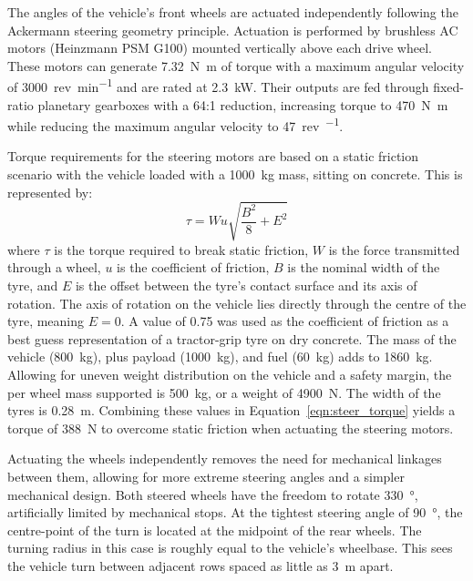 \documentclass[preprint,authoryear,12pt]{elsarticle}
\begin{document}
        The angles of the vehicle's front wheels are actuated independently following the Ackermann steering geometry principle.
        Actuation is performed by brushless AC motors (Heinzmann PSM G100) mounted vertically above each drive wheel.
        These motors can generate \SI{7.32}{\newton\meter} of torque with a maximum angular velocity of \SI{3000}{rev\per\minute} and are rated at \SI{2.3}{\kilo\watt}.
        Their outputs are fed through fixed-ratio planetary gearboxes with a 64:1 reduction, increasing torque to \SI{470}{\newton\meter} while reducing the maximum angular velocity to \SI{47}{rev\per\min}.

        Torque requirements for the steering motors are based on a static friction scenario with the vehicle loaded with a \SI{1000}{\kilo\gram} mass, sitting on concrete.
        This is represented by:
        \begin{equation}
        \label{eqn:steer_torque}
        \tau = W u \sqrt{\frac{B^2}{8} + E^2}
        \end{equation}
        where $\tau$ is the torque required to break static friction, $W$ is the force transmitted through a wheel, $u$ is the coefficient of friction, $B$ is the nominal width of the tyre, and $E$ is the offset between the tyre's contact surface and its axis of rotation.
        The axis of rotation on the vehicle lies directly through the centre of the tyre, meaning $E=0$.
        A value of 0.75 was used as the coefficient of friction as a best guess representation of a tractor-grip tyre on dry concrete.
        The mass of the vehicle (\SI{800}{\kilo\gram}), plus payload (\SI{1000}{\kilo\gram}), and fuel (\SI{60}{\kilo\gram}) adds to \SI{1860}{\kilo\gram}.
        Allowing for uneven weight distribution on the vehicle and a safety margin, the per wheel mass supported is \SI{500}{\kilo\gram}, or a weight of \SI{4900}{\newton}.
        The width of the tyres is \SI{0.28}{\meter}.
        Combining these values in Equation~\ref{eqn:steer_torque} yields a torque of \SI{388}{\newton} to overcome static friction when actuating the steering motors.

        Actuating the wheels independently removes the need for mechanical linkages between them, allowing for more extreme steering angles and a simpler mechanical design.
        Both steered wheels have the freedom to rotate \SI{330}{\degree}, artificially limited by mechanical stops.
        At the tightest steering angle of \SI{90}{\degree}, the centre-point of the turn is located at the midpoint of the rear wheels.
        The turning radius in this case is roughly equal to the vehicle's wheelbase.
        This sees the vehicle turn between adjacent rows spaced as little as \SI{3}{\meter} apart.
\end{document}
